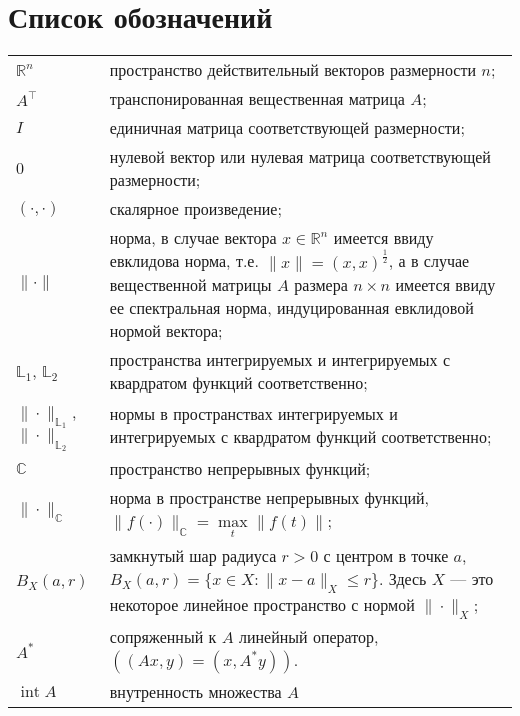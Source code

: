 \documentclass[../main.tex]{subfiles}
\begin{document}
\clearpage
\section*{Список обозначений}
\begin{tabularx}{\textwidth}{lY}
	$\mathbb{R}^n$ & пространство действительный векторов размерности $n$; \\ 
	$A^{\top}$ & транспонированная вещественная матрица $A$; \\ 
	$I$ & единичная матрица соответствующей размерности; \\ 
	$0$ & нулевой вектор или нулевая матрица соответствующей размерности; \\
	$(\cdot,\cdot)$ & скалярное произведение; \\
	$\| \cdot\| $ &  норма, в случае вектора $x \in \mathbb{R}^n$ имеется ввиду евклидова норма,  т.е. $\|x\| = (x,x)^{\frac{1}{2}}$, а в случае вещественной  матрицы $A$ размера $n \times n$ имеется ввиду ее спектральная норма, индуцированная евклидовой нормой вектора; \\
	$\mathbb{L}_1$, $\mathbb{L}_2$ & пространства интегрируемых и интегрируемых с квардратом функций соответственно; \\
	$\|\cdot\|_{\mathbb{L}_1}$, $\|\cdot\|_{\mathbb{L}_2}$ & нормы в пространствах интегрируемых и интегрируемых с квардратом функций соответственно; \\
	$ \mathbb{C} $ & пространство непрерывных функций; \\
	$\|\cdot\|_\mathbb{C}$ & норма в пространстве непрерывных функций, $\|f(\cdot) \|_\mathbb{C} = \max\limits_{t} \|f(t)\|$; \\
	$B_X(a,r)$ & замкнутый шар радиуса $r>0$ с центром в точке $a$, $B_X(a, r) = \{x\in X: \|x-a\|_X \leqslant r \}$. Здесь $X$ --- это некоторое линейное пространство с нормой $\|\cdot\|_X$; \\
	$ A^* $ & сопряженный к $A$ линейный оператор, $((Ax, y) = (x, A^*y))$. \\
	$ \operatorname{int}A $   & внутренность множества $A$ \\
\end{tabularx}
\end{document}
